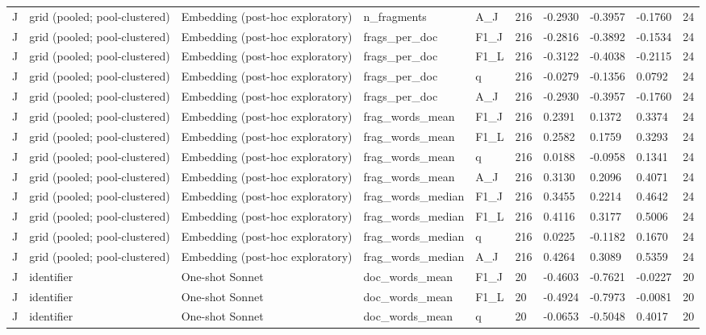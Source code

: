 \begin{table}[t]
{\begin{tabular}{llllllllll}
J & grid (pooled; pool-clustered) & Embedding (post-hoc exploratory) & n\_fragments & A\_J & 216 & -0.2930 & -0.3957 & -0.1760 & 24 \\
J & grid (pooled; pool-clustered) & Embedding (post-hoc exploratory) & frags\_per\_doc & F1\_J & 216 & -0.2816 & -0.3892 & -0.1534 & 24 \\
J & grid (pooled; pool-clustered) & Embedding (post-hoc exploratory) & frags\_per\_doc & F1\_L & 216 & -0.3122 & -0.4038 & -0.2115 & 24 \\
J & grid (pooled; pool-clustered) & Embedding (post-hoc exploratory) & frags\_per\_doc & q & 216 & -0.0279 & -0.1356 & 0.0792 & 24 \\
J & grid (pooled; pool-clustered) & Embedding (post-hoc exploratory) & frags\_per\_doc & A\_J & 216 & -0.2930 & -0.3957 & -0.1760 & 24 \\
J & grid (pooled; pool-clustered) & Embedding (post-hoc exploratory) & frag\_words\_mean & F1\_J & 216 & 0.2391 & 0.1372 & 0.3374 & 24 \\
J & grid (pooled; pool-clustered) & Embedding (post-hoc exploratory) & frag\_words\_mean & F1\_L & 216 & 0.2582 & 0.1759 & 0.3293 & 24 \\
J & grid (pooled; pool-clustered) & Embedding (post-hoc exploratory) & frag\_words\_mean & q & 216 & 0.0188 & -0.0958 & 0.1341 & 24 \\
J & grid (pooled; pool-clustered) & Embedding (post-hoc exploratory) & frag\_words\_mean & A\_J & 216 & 0.3130 & 0.2096 & 0.4071 & 24 \\
J & grid (pooled; pool-clustered) & Embedding (post-hoc exploratory) & frag\_words\_median & F1\_J & 216 & 0.3455 & 0.2214 & 0.4642 & 24 \\
J & grid (pooled; pool-clustered) & Embedding (post-hoc exploratory) & frag\_words\_median & F1\_L & 216 & 0.4116 & 0.3177 & 0.5006 & 24 \\
J & grid (pooled; pool-clustered) & Embedding (post-hoc exploratory) & frag\_words\_median & q & 216 & 0.0225 & -0.1182 & 0.1670 & 24 \\
J & grid (pooled; pool-clustered) & Embedding (post-hoc exploratory) & frag\_words\_median & A\_J & 216 & 0.4264 & 0.3089 & 0.5359 & 24 \\
J & identifier & One-shot Sonnet & doc\_words\_mean & F1\_J & 20 & -0.4603 & -0.7621 & -0.0227 & 20 \\
J & identifier & One-shot Sonnet & doc\_words\_mean & F1\_L & 20 & -0.4924 & -0.7973 & -0.0081 & 20 \\
J & identifier & One-shot Sonnet & doc\_words\_mean & q & 20 & -0.0653 & -0.5048 & 0.4017 & 20 \\

\end{tabular}}
\end{table}

